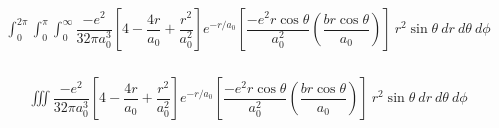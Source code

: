 


\begin{gather*}
    \int_0^{2\pi}\int_0^{\pi}\int_0^{\infty}\dfrac{-e^2}{32\pi a_0^3}\left[4-\dfrac{4r}{a_0}+ 
    \dfrac{r^2}{a_0^2}\right] e^{-r/a_0}\left[\dfrac{-e^{2}  r\cos\theta}{a_0^2}\left( \dfrac{br\cos\theta}
    {a_0}\right)\right]\ r^2\sin\theta \ dr\ d\theta\ d\phi \\[4mm]
\end{gather*}

\begin{gather*}
   \iiint\dfrac{-e^2}{32\pi a_0^3}\left[4-\dfrac{4r}{a_0}+ 
    \dfrac{r^2}{a_0^2}\right] e^{-r/a_0}\left[\dfrac{-e^{2}  r\cos\theta}{a_0^2}\left( \dfrac{br\cos\theta}
    {a_0}\right)\right]\ r^2\sin\theta \ dr\ d\theta\ d\phi \\[4mm]
\end{gather*}


